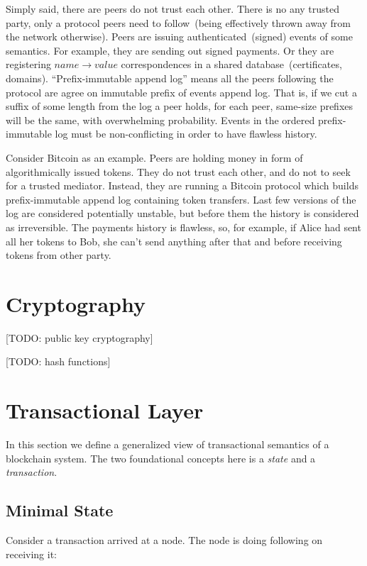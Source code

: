 \documentclass[]{report}   %
\begin{document}
Simply said, there are peers do not trust each other. There is no any trusted party, only a protocol peers need to follow~(being effectively thrown away from the network otherwise). Peers are issuing authenticated~(signed) events of some semantics. For example, they are sending out signed payments. Or they are registering \(name \rightarrow value\) correspondences in a shared database~(certificates, domains). ``Prefix-immutable append log'' means all the peers following the protocol are agree on immutable prefix of events append log. That is, if we cut a suffix of some length from the log a peer holds, for each peer, same-size prefixes will be the same, with overwhelming probability. Events in the ordered prefix-immutable log must be non-conflicting in order to have flawless history.

Consider Bitcoin as an example. Peers are holding money in form of algorithmically issued tokens. They do not trust each other, and do not to seek for a trusted mediator. Instead, they are running a Bitcoin protocol which builds prefix-immutable append log containing token transfers. Last few versions of the log are considered potentially unstable, but before them the history is considered as irreversible. The payments history is flawless, so, for example, if Alice had sent all her tokens to Bob, she can't send anything after that and before receiving tokens from other party.

\section{Cryptography}

[TODO: public key cryptography]

[TODO: hash functions]


\section{Transactional Layer}

In this section we define a generalized view of transactional semantics of a blockchain system. The two foundational concepts here is a \textit{state} and a \textit{transaction}.

\subsection{Minimal State}     %
	Consider a transaction arrived at a node. The node is doing following on receiving it:
\end{document}

